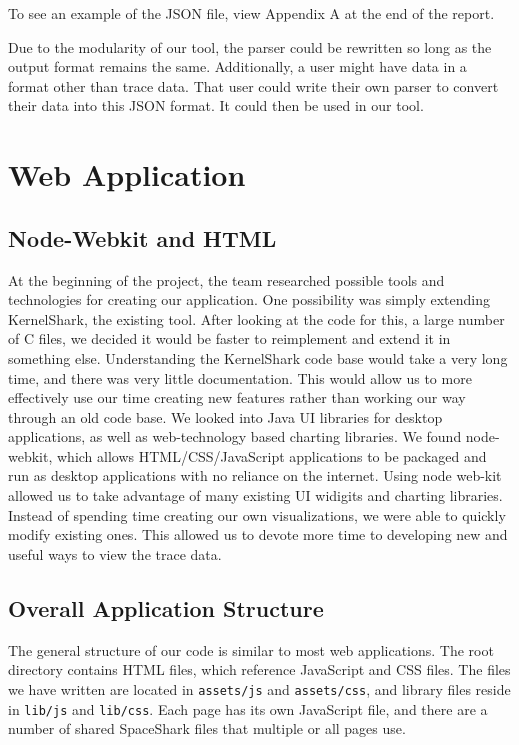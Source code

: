 \documentclass{hmcclinic}
\begin{document}
  To see an example of the JSON file, view Appendix A at the end of the report.
  \newline
  \newline
  
  Due to the modularity of our tool, the parser could be rewritten so long as
  the output format remains the same. Additionally, a user might have data
  in a format other than trace data. That user could write their own parser to
  convert their data into this JSON format. It could then be used in our tool.

  \section{Web Application}

  
  \subsection{Node-Webkit and HTML} %
    At the beginning of the project, the team researched possible tools and
    technologies for creating our application. One possibility was simply
    extending KernelShark, the existing tool. After looking at the code for
    this, a large number of C files, we decided it would be faster to
    reimplement and extend it in something else. Understanding the KernelShark code base
    would take a very long time, and there was very little documentation. This
    would allow us to more effectively use our time creating new features rather
    than working our way through an old code base. We
    looked into Java UI libraries for desktop applications, as well as
    web-technology based charting libraries.  We found node-webkit, which allows
    HTML/CSS/JavaScript applications to be packaged and run as desktop
    applications with no reliance on the internet. 
    Using node web-kit allowed us to take advantage of many existing UI widigits
    and charting libraries. Instead of spending time creating our own
    visualizations, we were able to quickly modify existing ones. This allowed
    us to devote more time to developing new and useful ways to view the trace
    data.

  \subsection{Overall Application Structure}

  The general structure of our code is similar to most web applications. 
  The root directory contains HTML files, which reference JavaScript and CSS files. The files
  we have written are located in \texttt{assets/js} and \texttt{assets/css}, and
  library files reside in \texttt{lib/js} and \texttt{lib/css}.  Each page has
  its own JavaScript file, and there are a number of shared SpaceShark files that
  multiple or all pages use.
  
\end{document}
